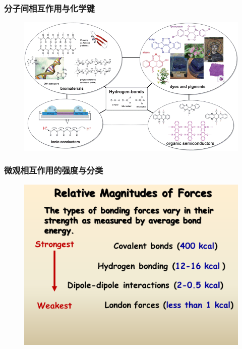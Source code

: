 \frame
{
	\frametitle{分子间相互作用与化学键}
\begin{figure}[h!]
\centering
\vspace{-25.5pt}
\includegraphics[height=0.67\textwidth,width=1.0\textwidth,viewport=0 0 830 500,clip]{Figures/Bio-H-bond-1.png}
\label{Bio-H-bond}
\end{figure}
}

\frame
{
	\frametitle{微观相互作用的强度与分类}
\begin{figure}[h!]
\centering
\vspace{-5.5pt}
\includegraphics[height=0.65\textwidth,width=1.05\textwidth,viewport=0 100 750 530,clip]{Figures/Bond-order.png}
\label{Bond-order}
\end{figure}
}

